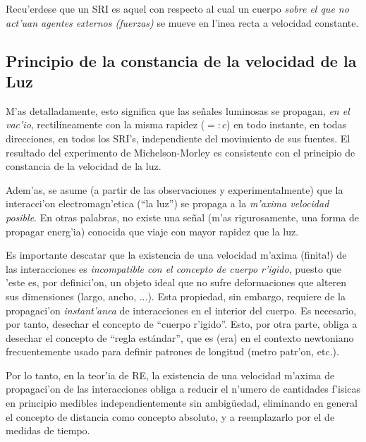 Recu'erdese que un SRI es aquel con respecto al cual un cuerpo \textit{sobre el que no act'uan agentes externos (fuerzas)} se mueve en l'inea recta a velocidad
constante.


\subsection{Principio de la constancia de la velocidad de la Luz}
 \begin{quotation}
\end{quotation}
M'as detalladamente, esto significa que las se\~nales luminosas se propagan, \textit{en el vac'io}, rectil\'ineamente con la misma rapidez ($=:c$) en todo instante, en todas direcciones, en todos los SRI's, independiente del movimiento de sus fuentes. El resultado del experimento de Michelson-Morley es consistente con el principio de constancia de la velocidad de la luz.

Adem'as, se asume (a partir de las observaciones y experimentalmente) que la interacci'on electromagn'etica (``la luz'') se propaga a la \textit{m'axima velocidad posible}. En otras palabras, no existe una se\~nal (m'as rigurosamente, una forma de propagar energ'ia) conocida que viaje con mayor rapidez que la luz.

Es importante descatar que la existencia de una velocidad m'axima (finita!) de las interacciones es \textit{incompatible con el concepto de
cuerpo r'igido}, puesto que 'este es, por definici'on, un objeto ideal
que no sufre deformaciones que alteren sus dimensiones (largo, ancho, ...).
Esta propiedad, sin embargo, requiere de la propagaci'on \textit{instant'anea} de interacciones en el interior del cuerpo. Es necesario, por tanto, desechar el concepto de ``cuerpo
r'igido''. Esto, por otra parte, obliga a desechar el concepto de ``regla
est\'andar'', que es (era) en el contexto newtoniano frecuentemente usado para definir patrones de longitud (metro patr'on, etc.).

Por lo tanto, en la teor'ia de RE, la existencia de una velocidad m'axima de propagaci'on de las interacciones obliga a reducir el n'umero de cantidades f'isicas en principio medibles independientemente sin ambig\"uedad, eliminando en general el concepto de distancia como concepto absoluto, y a reemplazarlo por el de medidas de tiempo.

